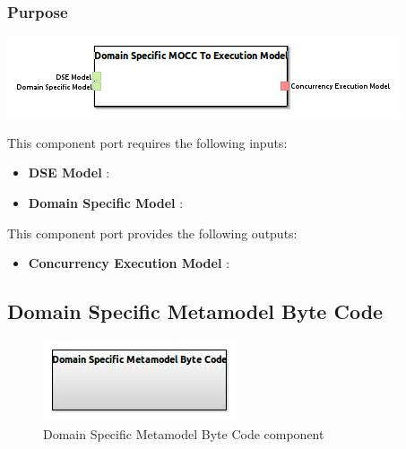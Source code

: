 \documentclass{gemoc} %
\begin{document}
\subsubsection{Purpose}

\begin{center}
\includegraphics*[trim=0.0cm 0.0cm 0cm 0.0cm, clip=true]{../images/generated/Generated_Domain_Specific_MOCC_To_Execution_Model.png}
\end{center}

This component port requires the following inputs:
\begin{itemize}
  \item \textbf{DSE Model} :
  \item \textbf{Domain Specific Model} :
\end{itemize}

This component port provides the following outputs:
\begin{itemize}
  \item \textbf{Concurrency Execution Model} :
\end{itemize}

\subsection{Domain Specific Metamodel Byte Code}

\begin{figure}[htp]
	\begin{center}
	\includegraphics*[trim=0.0cm 0.0cm 0cm 0.0cm, clip=true, scale=1.0]{../images/generated/Generated_Domain Specific Metamodel Byte Code.jpg}
	\caption{Domain Specific Metamodel Byte Code component}
	\end{center}
\end{figure}
\end{document}
